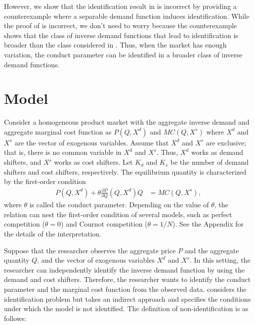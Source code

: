 \documentclass[11pt, a4paper]{article}
\theoremstyle{remark}
\begin{document}
However, we show that the identification result in \citet{lau1982identifying} is incorrect by providing a counterexample where a separable demand function induces identification.
While the proof of \citet{lau1982identifying} is incorrect, we don't need to worry because the counterexample shows that the class of inverse demand functions that lead to identification is broader than the class considered in \citet{lau1982identifying}.
Thus, when the market has enough variation, the conduct parameter can be identified in a broader class of inverse demand functions.


\section{Model}
Consider a homogeneous product market with the aggregate inverse demand and aggregate marginal cost function as $P(Q, X^{d})$ and $MC(Q, X^{s})$ where $X^{d}$ and $X^{s}$ are the vector of exogenous variables.
Assume that $X^{d}$ and $X^{s}$ are exclusive; that is, there is no common variable in $X^{d}$ and $X^{s}$.
Thus, $X^{d}$ works as demand shifters, and $X^{s}$ works as cost shifters. 
Let $K_d$ and $K_s$ be the number of demand shifters and cost shifters, respectively.
The equilibrium quantity is characterized by the first-order condition
 \begin{align}
    P(Q, X^{d}) + \theta \frac{\partial P}{\partial Q}(Q, X^{d})Q &= MC(Q, X^{s}),
\end{align}
where $\theta$ is called the conduct parameter. 
Depending on the value of $\theta$, the relation can nest the first-order condition of several models, such as perfect competition ($\theta=0$) and Cournot competition ($\theta=1/N$). 
See the Appendix for the details of the interpretation.


Suppose that the researcher observes the aggregate price $P$ and the aggregate quantity $Q$, and the vector of exogenous variables $X^{d}$ and $X^{s}$.
In this setting, the researcher can independently identify the inverse demand function by using the demand and cost shifters.
Therefore, the researcher wants to identify the conduct parameter and the marginal cost function from the observed data.
\citet{lau1982identifying} considers the identification problem but takes an indirect approach and specifies the conditions under which the model is not identified. 
The definition of non-identification is as follows:
\end{document}

